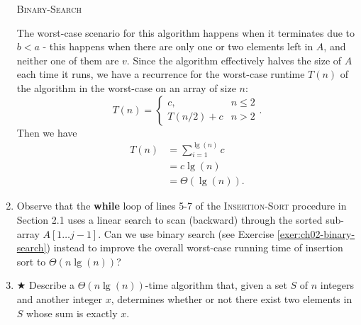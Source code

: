 \documentclass[Chapter02]{subfiles}
\begin{document}
\begin{enumerate}[leftmargin=\labelsep]
\begin{answer}
			\begin{algorithm}[H]
				\caption{\textsc{Binary-Search}}
				\label{alg:ch02-binary-search}

			\end{algorithm}

			The worst-case scenario for this algorithm happens when it terminates due to $b < a$ - this happens when there are only one or two elements left in $A$, and neither one of them are $v$. Since the algorithm effectively halves the size of $A$ each time it runs, we have a recurrence for the worst-case runtime $T(n)$ of the algorithm in the worst-case on an array of size $n$:
			\[
				T(n) =
				\begin{cases}
					c, &n \leq 2\\
					T(n/2) + c &n > 2
				\end{cases}.
			\]
			Then we have
			\begin{align*}
				T(n) &= \sum_{i = 1}^{\lg(n)} c\\
				     &= c\lg(n)\\
				     &= \Theta(\lg(n)).
			\end{align*}
		\end{answer}

		\item Observe that the \textbf{while} loop of lines 5-7 of the \textsc{Insertion-Sort} procedure in Section 2.1 uses a linear search to scan (backward) through the sorted sub-array $A[1 \dots j - 1]$. Can we use binary search (see Exercise \ref{exer:ch02-binary-search}) instead to improve the overall worst-case running time of insertion sort to $\Theta(n \lg(n))$?
		\begin{answer}
			
		\end{answer}

		\item $\bigstar$ Describe a $\Theta(n \lg(n))$-time algorithm that, given a set $S$ of $n$ integers and another integer $x$, determines whether or not there exist two elements in $S$ whose sum is exactly $x$.
		\begin{answer}
			
		\end{answer}

		
	\end{enumerate}
\end{document}

